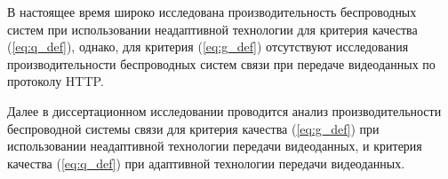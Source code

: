 В настоящее время широко исследована производительность беспроводных систем при использовании неадаптивной технологии для критерия качества (\ref{eq:q_def}), однако, для критерия (\ref{eq:g_def}) отсутствуют исследования производительности беспроводных систем связи при передаче видеоданных по протоколу HTTP.

Далее в диссертационном исследовании проводится анализ производительности беспроводной системы связи для критерия качества (\ref{eq:g_def}) при использовании неадаптивной технологии передачи видеоданных, и критерия качества (\ref{eq:q_def}) при адаптивной технологии передачи видеоданных.






